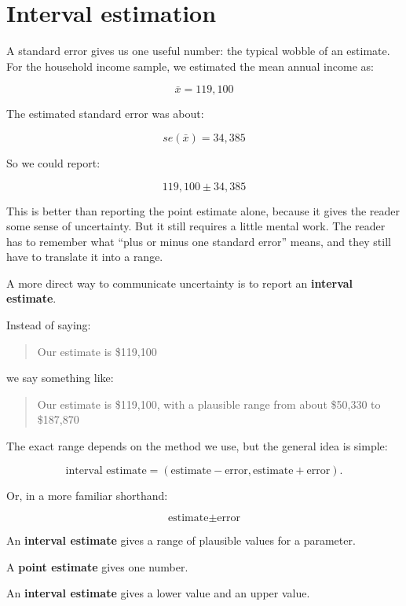 \documentclass[
  letterpaper,
  DIV=11,
  numbers=noendperiod]{scrreprt}
\begin{document}
\section{Interval estimation}\label{interval-estimation}

A standard error gives us one useful number: the typical wobble of an
estimate. For the household income sample, we estimated the mean annual
income as:

\[
\bar{x} = 119{,}100
\]

The estimated standard error was about:

\[
se(\bar{x}) = 34{,}385
\]

So we could report:

\[
119{,}100 \pm 34{,}385
\]

This is better than reporting the point estimate alone, because it gives
the reader some sense of uncertainty. But it still requires a little
mental work. The reader has to remember what ``plus or minus one
standard error'' means, and they still have to translate it into a
range.

A more direct way to communicate uncertainty is to report an
\textbf{interval estimate}.

Instead of saying:

\begin{quote}
Our estimate is \$119,100
\end{quote}

we say something like:

\begin{quote}
Our estimate is \$119,100, with a plausible range from about \$50,330 to
\$187,870
\end{quote}

The exact range depends on the method we use, but the general idea is
simple:

\[
\text{interval estimate}
=
\left(
\text{estimate} - \text{error},
\text{estimate} + \text{error}
\right).
\]

Or, in a more familiar shorthand:

\[
\text{estimate} \pm \text{error}
\]

\begin{tcolorbox}[enhanced jigsaw, arc=.35mm, bottomrule=.15mm, bottomtitle=1mm, breakable, colback=white, colbacktitle=quarto-callout-note-color!10!white, colframe=quarto-callout-note-color-frame, coltitle=black, left=2mm, leftrule=.75mm, opacityback=0, opacitybacktitle=0.6, rightrule=.15mm, title=\textcolor{quarto-callout-note-color}{\faInfo}\hspace{0.5em}{Terminology: interval estimate}, titlerule=0mm, toprule=.15mm, toptitle=1mm]

An \textbf{interval estimate} gives a range of plausible values for a
parameter.

A \textbf{point estimate} gives one number.

An \textbf{interval estimate} gives a lower value and an upper value.

\end{tcolorbox}
\end{document}
